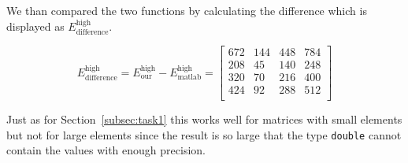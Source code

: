 \documentclass[paper=a4, fontsize=11pt]{article} %
\begin{document}
We than compared the two functions by calculating the difference which
is displayed as $E_{\text{difference}}^{\text{high}}$.


\[
  E_{\text{difference}}^{\text{high}} = E_{\text{our}}^{\text{high}} - E_{\text{matlab}}^{\text{high}} =
\begin{bmatrix}
 672 & 144 & 448 & 784 \\
 208 & 45 & 140 & 248 \\
 320 & 70 & 216 & 400 \\
 424 & 92 & 288 & 512 \\
\end{bmatrix}
\]

Just as for Section~\ref{subsec:task1} this works well for matrices
with small elements but not for large elements since the result is so
large that the type \texttt{double} cannot contain the values with
enough precision.
\end{document}
